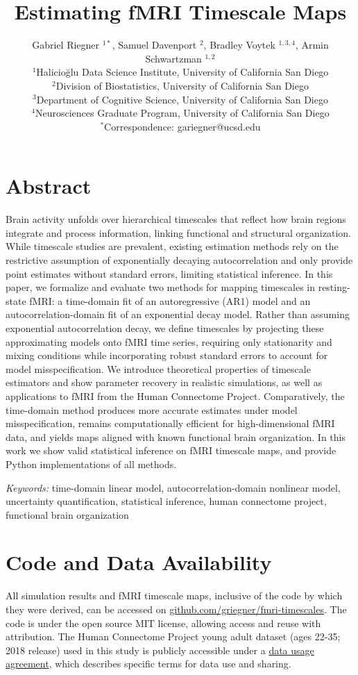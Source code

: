 \documentclass[9pt]{article}
\title{Estimating fMRI Timescale Maps}
\author{Gabriel Riegner $^{1\ast}$, Samuel Davenport $^{2}$, Bradley Voytek $^{1,3,4}$, Armin Schwartzman $^{1,2}$\\
{\small $^{1}$Halicio\u{g}lu Data Science Institute, University of California San Diego}\\
{\small $^{2}$Division of Biostatistics, University of California San Diego}\\
{\small $^{3}$Department of Cognitive Science, University of California San Diego}\\
{\small $^{4}$Neurosciences Graduate Program, University of California San Diego}\\
{\small $^\ast$Correspondence:  gariegner@ucsd.edu}
}
\date{}
\begin{document}


\maketitle

\section*{Abstract}
Brain activity unfolds over hierarchical timescales that reflect how brain regions integrate and process information, linking functional and structural organization. While timescale studies are prevalent, existing estimation methods rely on the restrictive assumption of exponentially decaying autocorrelation and only provide point estimates without standard errors, limiting statistical inference. In this paper, we formalize and evaluate two methods for mapping timescales in resting-state fMRI: a time-domain fit of an autoregressive (AR1) model and an autocorrelation-domain fit of an exponential decay model. Rather than assuming exponential autocorrelation decay, we define timescales by projecting these approximating models onto fMRI time series, requiring only stationarity and mixing conditions while incorporating robust standard errors to account for model misspecification. We introduce theoretical properties of timescale estimators and show parameter recovery in realistic simulations, as well as applications to fMRI from the Human Connectome Project. Comparatively, the time-domain method produces more accurate estimates under model misspecification, remains computationally efficient for high-dimensional fMRI data, and yields maps aligned with known functional brain organization. In this work we show valid statistical inference on fMRI timescale maps, and provide Python implementations of all methods.

\vfill
\noindent\textit{Keywords:} time-domain linear model, autocorrelation-domain nonlinear model, uncertainty quantification, statistical inference, human connectome project, functional brain organization
\thispagestyle{empty}
\newpage
\setcounter{page}{1}







\section*{Code and Data Availability}
All simulation results and fMRI timescale maps, inclusive of the code by which they were derived, can be accessed on \href{https://github.com/griegner/fmri-timescales}{github.com/griegner/fmri-timescales}. The code is under the open source MIT license, allowing access and reuse with attribution. The Human Connectome Project young adult dataset (ages 22-35; 2018 release) used in this study is publicly accessible under a \href{https://www.humanconnectome.org/storage/app/media/data_use_terms/DataUseTerms-HCP-Open-Access-26Apr2013.pdf}{data usage agreement}, which describes specific terms for data use and sharing.
\end{document}
